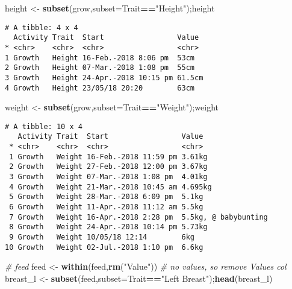 \documentclass[10,portrait]{article}
\newenvironment{Shaded}{\begin{snugshade}}{\end{snugshade}}
\newcommand{\KeywordTok}[1]{\textcolor[rgb]{0.13,0.29,0.53}{\textbf{#1}}}
\newcommand{\DataTypeTok}[1]{\textcolor[rgb]{0.13,0.29,0.53}{#1}}
\newcommand{\StringTok}[1]{\textcolor[rgb]{0.31,0.60,0.02}{#1}}
\newcommand{\CommentTok}[1]{\textcolor[rgb]{0.56,0.35,0.01}{\textit{#1}}}
\newcommand{\OperatorTok}[1]{\textcolor[rgb]{0.81,0.36,0.00}{\textbf{#1}}}
\newcommand{\NormalTok}[1]{#1}
\begin{document}
\begin{Shaded}
\begin{Highlighting}[]
\NormalTok{height <-}\StringTok{ }\KeywordTok{subset}\NormalTok{(grow,}\DataTypeTok{subset=}\NormalTok{Trait}\OperatorTok{==}\StringTok{"Height"}\NormalTok{);height}
\end{Highlighting}
\end{Shaded}

\begin{verbatim}
# A tibble: 4 x 4
  Activity Trait  Start                 Value 
* <chr>    <chr>  <chr>                 <chr> 
1 Growth   Height 16-Feb.-2018 8:06 pm  53cm  
2 Growth   Height 07-Mar.-2018 1:08 pm  55cm  
3 Growth   Height 24-Apr.-2018 10:15 pm 61.5cm
4 Growth   Height 23/05/18 20:20        63cm  
\end{verbatim}

\begin{Shaded}
\begin{Highlighting}[]
\NormalTok{weight <-}\StringTok{ }\KeywordTok{subset}\NormalTok{(grow,}\DataTypeTok{subset=}\NormalTok{Trait}\OperatorTok{==}\StringTok{"Weight"}\NormalTok{);weight  }
\end{Highlighting}
\end{Shaded}

\begin{verbatim}
# A tibble: 10 x 4
   Activity Trait  Start                 Value               
 * <chr>    <chr>  <chr>                 <chr>               
 1 Growth   Weight 16-Feb.-2018 11:59 pm 3.61kg              
 2 Growth   Weight 27-Feb.-2018 12:00 pm 3.67kg              
 3 Growth   Weight 07-Mar.-2018 1:08 pm  4.01kg              
 4 Growth   Weight 21-Mar.-2018 10:45 am 4.695kg             
 5 Growth   Weight 28-Mar.-2018 6:09 pm  5.1kg               
 6 Growth   Weight 11-Apr.-2018 11:12 am 5.5kg               
 7 Growth   Weight 16-Apr.-2018 2:28 pm  5.5kg, @ babybunting
 8 Growth   Weight 24-Apr.-2018 10:14 pm 5.73kg              
 9 Growth   Weight 10/05/18 12:14        6kg                 
10 Growth   Weight 02-Jul.-2018 1:10 pm  6.6kg               
\end{verbatim}

\begin{Shaded}
\begin{Highlighting}[]
\CommentTok{# feed}
\NormalTok{feed <-}\StringTok{ }\KeywordTok{within}\NormalTok{(feed,}\KeywordTok{rm}\NormalTok{(}\StringTok{"Value"}\NormalTok{)) }\CommentTok{# no values, so remove Values col}
\NormalTok{breast_l <-}\StringTok{ }\KeywordTok{subset}\NormalTok{(feed,}\DataTypeTok{subset=}\NormalTok{Trait}\OperatorTok{==}\StringTok{"Left Breast"}\NormalTok{);}\KeywordTok{head}\NormalTok{(breast_l)}
\end{Highlighting}
\end{Shaded}
\end{document}
